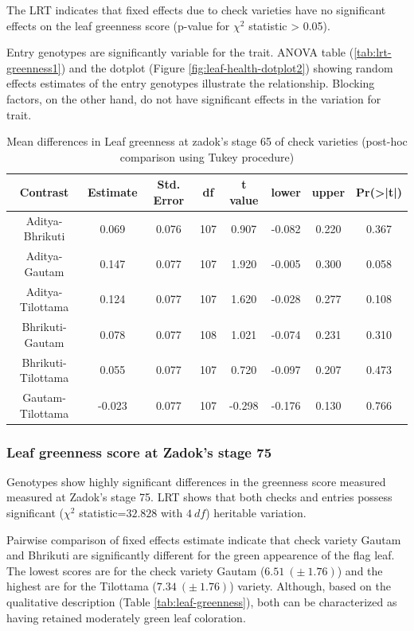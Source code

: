 \documentclass[12pt,oneside]{dukestatscithesis} %
\begin{document}
The LRT indicates that fixed effects due to check varieties have no significant effects on the leaf greenness score (p-value for \(\chi^2\) statistic \textgreater{} 0.05).

Entry genotypes are significantly variable for the trait. ANOVA table (\ref{tab:lrt-greenness1}) and the dotplot (Figure \ref{fig:leaf-health-dotplot2}) showing random effects estimates of the entry genotypes illustrate the relationship. Blocking factors, on the other hand, do not have significant effects in the variation for trait.
\begin{table}[H]

\caption{\label{tab:leaf-health-meanconf-tab2}Mean differences in Leaf greenness at zadok's stage 65 of check varieties (post-hoc comparison using Tukey procedure)}
\centering
\begin{tabular}[t]{cccccccc}
\toprule
Contrast & Estimate & Std. Error & df & t value & lower & upper & Pr(>|t|)\\
\midrule
Aditya-Bhrikuti & 0.069 & 0.076 & 107 & 0.907 & -0.082 & 0.220 & 0.367\\
Aditya-Gautam & 0.147 & 0.077 & 107 & 1.920 & -0.005 & 0.300 & 0.058\\
Aditya-Tilottama & 0.124 & 0.077 & 107 & 1.620 & -0.028 & 0.277 & 0.108\\
Bhrikuti-Gautam & 0.078 & 0.077 & 108 & 1.021 & -0.074 & 0.231 & 0.310\\
Bhrikuti-Tilottama & 0.055 & 0.077 & 107 & 0.720 & -0.097 & 0.207 & 0.473\\
Gautam-Tilottama & -0.023 & 0.077 & 107 & -0.298 & -0.176 & 0.130 & 0.766\\
\bottomrule
\end{tabular}
\end{table}
\hypertarget{leaf-greenness-score-at-zadoks-stage-75}{%
\subsubsection{Leaf greenness score at Zadok's stage 75}\label{leaf-greenness-score-at-zadoks-stage-75}}

Genotypes show highly significant differences in the greenness score measured measured at Zadok's stage 75. LRT shows that both checks and entries possess significant (\(\chi^2\) statistic=\(32.828\) with \(4\ df\)) heritable variation.

Pairwise comparison of fixed effects estimate indicate that check variety Gautam and Bhrikuti are significantly different for the green appearence of the flag leaf. The lowest scores are for the check variety Gautam (\(6.51\ (\pm\ 1.76)\)) and the highest are for the Tilottama (\(7.34\ (\pm\ 1.76)\)) variety. Although, based on the qualitative description (Table \ref{tab:leaf-greenness}), both can be characterized as having retained moderately green leaf coloration.
\end{document}
